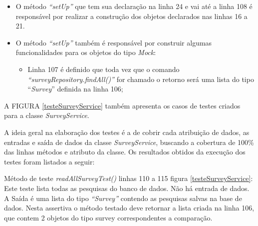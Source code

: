 \begin{itemize}
 \item O método \textit{“setUp”} que tem sua declaração na linha 24 e vai até a linha 108 é responsável por realizar a construção dos objetos declarados nas linhas 16 a 21.

\item O método  \textit{“setUp”} também é responsável por construir algumas funcionalidades para os objetos do tipo \textit{Mock}:

\begin{itemize}

 \item Linha  107 é definido que toda vez que o comando \textit{“surveyRepository.findAll()”} for chamado o retorno será uma lista do tipo “\textit{Survey}” definida na linha 106;
\end{itemize}{}
\end{itemize}{}


A FIGURA \ref{testeSurveyService} também apresenta os casos de testes criados para a classe \textit{SurveyService}. 


A ideia geral na elaboração dos testes é a de cobrir cada atribuição de dados, as entradas e saída de dados da classe \textit{ SurveyService}, buscando a cobertura de 100\% das linhas métodos e atributo da classe. Os resultados obtidos da execução dos testes foram listados a seguir:


Método de teste \textit{ readAllSurveyTest()} linhas 110 a 115 figura \ref{testeSurveyService}: Este teste lista todas as pesquisas do banco de dados. Não há entrada de dados. A Saída é uma lista do tipo \textit{“Survey”} contendo as pesquisas salvas na base de dados. Nesta assertiva o método testado deve retornar a lista criada na linha 106, que contem 2 objetos do tipo survey correspondentes a comparação.


